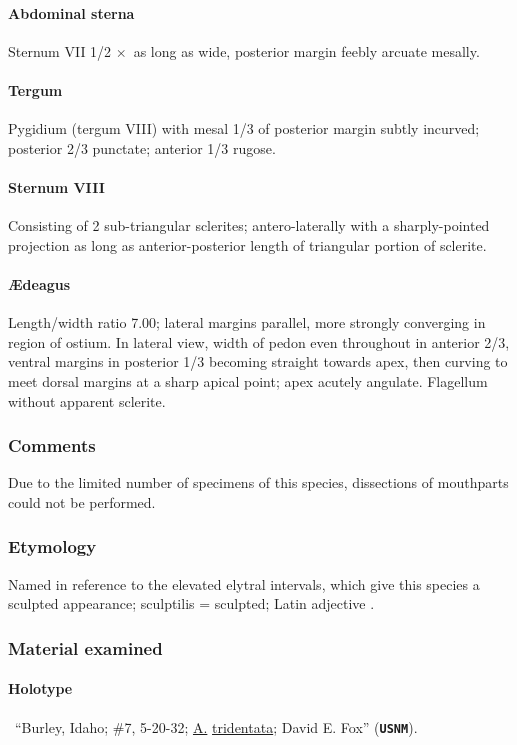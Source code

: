 \documentclass[fleqn,10pt,lineno]{wlpeerj} %
\newcommand{\x}{$\times$~}
\begin{document}
			\paragraph{Abdominal sterna}
				Sternum VII 1/2 \x as long as wide, posterior margin feebly arcuate mesally.
			\paragraph{Tergum}
				Pygidium (tergum VIII) with mesal 1/3 of posterior margin subtly incurved; posterior 2/3 punctate; anterior 1/3 rugose.
			\paragraph{Sternum VIII}
				Consisting of 2 sub-triangular sclerites; antero-laterally with a sharply-pointed projection as long as anterior-posterior length of triangular portion of sclerite.
			\paragraph{{\AE}deagus}
				Length/width ratio 7.00; lateral margins parallel, more strongly converging in region of ostium. 
				In lateral view, width of pedon even throughout in anterior 2/3, ventral margins in posterior 1/3 becoming straight towards apex, then curving to meet dorsal margins at a sharp apical point; apex acutely angulate. 
				Flagellum without apparent sclerite.
		\subsubsection*{Comments}
			Due to the limited number of specimens of this species, dissections of mouthparts could not be performed.
		\subsubsection*{Etymology}
			Named in reference to the elevated elytral intervals, which give this species a sculpted appearance; sculptilis = sculpted; Latin adjective \citep{brown1956}.
		\subsubsection*{Material examined}
			\paragraph{Holotype}
				\female~``Burley, Idaho; \#7, 5-20-32; \underline{A.} \underline{tridentata}; David E. Fox'' (\texttt{\textbf{USNM}}).
\end{document}

